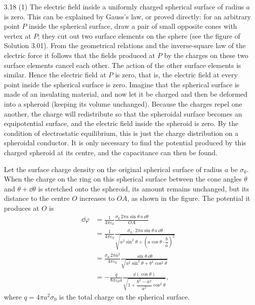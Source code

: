 \begin{solution}{3.18}
(1) The electric field inside a uniformly charged spherical surface of radius $a$ is zero. This can be explained by Gauss's law, or proved directly: for an arbitrary point $P$ inside the spherical surface, draw a pair of small opposite cones with vertex at $P$; they cut out two surface elements on the sphere (see the figure of Solution 3.01). From the geometrical relations and the inverse-square law of the electric force it follows that the fields produced at $P$ by the charges on these two surface elements cancel each other. The action of the other surface elements is similar. Hence the electric field at $P$ is zero, that is, the electric field at every point inside the spherical surface is zero. Imagine that the spherical surface is made of an insulating material, and now let it be charged and then be deformed into a spheroid (keeping its volume unchanged). Because the charges repel one another, the charge will redistribute so that the spheroidal surface becomes an equipotential surface, and the electric field inside the spheroid is zero. By the condition of electrostatic equilibrium, this is just the charge distribution on a spheroidal conductor. It is only necessary to find the potential produced by this charged spheroid at its centre, and the capacitance can then be found.

Let the surface charge density on the original spherical surface of radius $a$ be $\sigma_0$. When the charge on the ring on this spherical surface between the cone angles $\theta$ and $\theta+\dd\theta$ is stretched onto the spheroid, its amount remains unchanged, but its distance to the centre $O$ increases to $OA$, as shown in the figure. The potential it produces at $O$ is
\begin{align*}
\dd\varphi&=\frac{1}{4\pi\varepsilon_0}\frac{\sigma_0\,2\pi a\sin\theta\,a\,\dd\theta}{OA}\\
&=\frac{1}{4\pi\varepsilon_0}\frac{\sigma_0\cdot2\pi a\sin\theta\,a\,\dd\theta}
{\sqrt{a^2\sin^2\theta+\left(a\cos\theta\cdot\dfrac{b}{a}\right)^2}}\\
&=\frac{\sigma_0\,2\pi a^2}{4\pi\varepsilon_0}
\frac{\sin\theta\,\dd\theta}{\sqrt{a^2\sin^2\theta+b^2\cos^2\theta}}\\
&=-\frac{q}{8\pi\varepsilon_0a}
\frac{\dd(\cos\theta)}{\sqrt{1+\dfrac{b^2-a^2}{a^2}\cos^2\theta}},
\end{align*}
where $q=4\pi a^2\sigma_0$ is the total charge on the spherical surface.


\end{solution}
